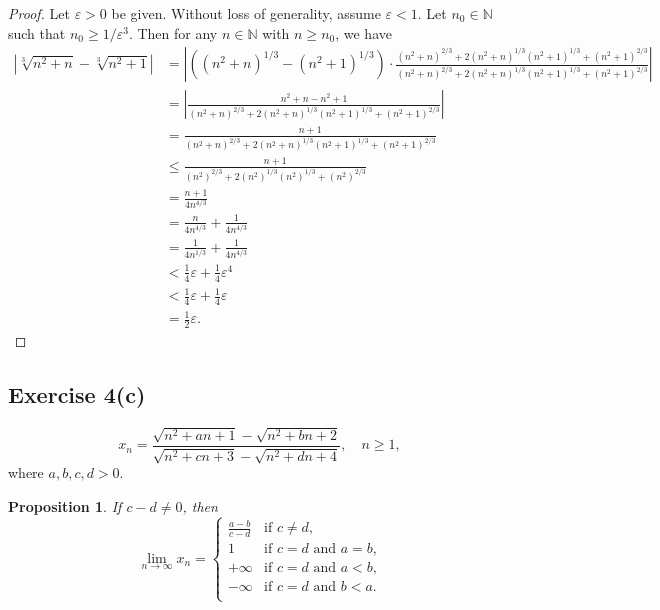 \documentclass[12pt]{article}
\newtheorem{proposition}{Proposition}
\newenvironment{problem}
    {\begin{lrbox}{\mybox}\begin{minipage}{0.98\textwidth}}
    {\end{minipage}\end{lrbox}\framebox[\textwidth]{\usebox{\mybox}}}
\let\eps\varepsilon %
\newcommand{\N}{\mathbb{N}} %
\newcommand{\<}{\left\langle} %
\renewcommand{\>}{\right\rangle} %
\begin{document}
\begin{proof}
    Let $\eps>0$ be given. Without loss of generality, assume $\eps<1$. Let $n_0\in\N$ such that $n_0 \geq 1/{\eps^3}$. Then for any $n\in\N$ with $n\geq n_0$, we have
    \begin{align*}
        |\sqrt[3]{n^2+n}-\sqrt[3]{n^2+1}| 
            &= \left| ((n^2+n)^{1/3}-(n^2 + 1)^{1/3}) \cdot \frac{(n^2+n)^{2/3} + 2(n^2+n)^{1/3}(n^2+1)^{1/3} + (n^2+1)^{2/3}}{(n^2+n)^{2/3} + 2(n^2+n)^{1/3}(n^2+1)^{1/3} + (n^2+1)^{2/3}} \right| \\
            &= \left|\frac{n^2+n-n^2 + 1}{(n^2+n)^{2/3}+2(n^2+n)^{1/3}(n^2+1)^{1/3} + (n^2+1)^{2/3}} \right| \\
            &= \frac{n + 1}{(n^2+n)^{2/3}+2(n^2+n)^{1/3}(n^2+1)^{1/3} + (n^2+1)^{2/3}} \\
            &\leq \frac{n + 1}{(n^2)^{2/3}+2(n^2)^{1/3}(n^2)^{1/3} + (n^2)^{2/3}} \\
            &= \frac{n + 1}{4n^{4/3}} \\
            &= \frac{n}{4n^{4/3}} + \frac{1}{4n^{4/3}} \\
            &= \frac{1}{4n^{1/3}} + \frac{1}{4n^{4/3}} \\
            &< \frac14\eps + \frac14\eps^4 \\
            &< \frac14\eps + \frac14\eps \\
            &= \frac12\eps.
    \end{align*}
    
\end{proof}

\newpage
\subsection*{Exercise 4(c)}
\begin{problem}
    \begin{equation}
        x_n = \frac{\sqrt{n^2+an+1}-\sqrt{n^2+bn+2}}{\sqrt{n^2+cn+3}-\sqrt{n^2+dn+4}},\quad n \ge 1,
    \end{equation}
    where $a,b,c,d>0$.
\end{problem}

\begin{proposition}
    If $c-d\ne0$, then
    \[\lim_{n\to\infty}x_n =
        \begin{cases}
            \frac{a-b}{c-d} &\text{if $c\ne d$,} \\
            1 &\text{if $c=d$ and $a=b$,} \\
            +\infty &\text{if $c=d$ and $a<b$,} \\
            -\infty &\text{if $c=d$ and $b<a$.} \\
        \end{cases}
    \]
\end{proposition}
\end{document}
